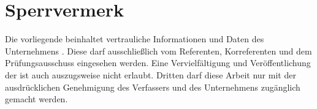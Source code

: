 \chapter*{Sperrvermerk}
Die vorliegende \insertDokumentenart beinhaltet vertrauliche
Informationen und Daten des Unternehmens \insertUnternehmen.
Diese \insertDokumentenart darf ausschließlich vom Referenten,
Korreferenten und dem Prüfungsausschuss eingesehen
werden. Eine Vervielfältigung und Veröffentlichung der
\insertDokumentenart ist auch auszugsweise nicht erlaubt.
Dritten darf diese Arbeit nur mit der ausdrücklichen
Genehmigung des Verfassers und des Unternehmens
zugänglich gemacht werden.
